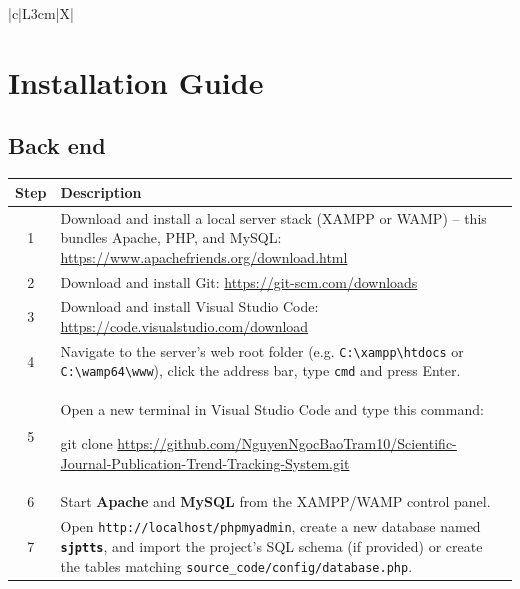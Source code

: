 \documentclass[12pt,a4paper]{article}
\begin{document}
{{\begin{table}[htbp]
\begin{tabularx}{\textwidth}{|c|L{3cm}|X|}
		\end{tabularx}
	\end{table}
	


\section{  Installation Guide}

\subsection{Back end}
{
	\begin{table}[H]
		\centering
		
		\begin{tabularx}{\textwidth}{|c|X|}
			\hline
			\rowcolor{yellowheader}
			\textbf{Step} & \textbf{Description} \\
			\hline
			
			1 & Download and install a local server stack (XAMPP or WAMP) -- this bundles Apache, PHP, and MySQL: \url{https://www.apachefriends.org/download.html} \\
			\hline
			
			\rowcolor{yellowrow}
			2 & Download and install Git: \url{https://git-scm.com/downloads} \\
			\hline
			
			3 & Download and install Visual Studio Code: \url{https://code.visualstudio.com/download} \\
			\hline
			
			\rowcolor{yellowrow}
			4 & Navigate to the server's web root folder (e.g. \texttt{C:\textbackslash xampp\textbackslash htdocs} or \texttt{C:\textbackslash wamp64\textbackslash www}), click the address bar, type \texttt{cmd} and press Enter. \\
			\hline
			
			5 & Open a new terminal in Visual Studio Code and type this command:
			
			git clone \url{https://github.com/NguyenNgocBaoTram10/Scientific-Journal-Publication-Trend-Tracking-System.git} \\
			\hline
			
			\rowcolor{yellowrow}
			6 & Start \textbf{Apache} and \textbf{MySQL} from the XAMPP/WAMP control panel. \\
			\hline
			
			7 & Open \texttt{http://localhost/phpmyadmin}, create a new database named \textbf{\texttt{sjptts}}, and import the project's SQL schema (if provided) or create the tables matching \texttt{source\_code/config/database.php}. \\
			\hline
			

\end{tabularx}
\end{table}}}}
\end{document}
